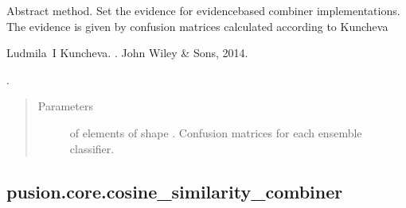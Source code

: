 \documentclass[letterpaper,10pt,english]{sphinxmanual}
\begin{document}
\begin{fulllineitems}
\begin{fulllineitems}
\end{fulllineitems}


\begin{fulllineitems}
\label{\detokenize{pusion.core.combiner:pusion.core.combiner.EvidenceBasedCombiner.set_evidence}}
\sphinxAtStartPar
Abstract method. Set the evidence for evidence\sphinxhyphen{}based combiner implementations.
The evidence is given by confusion matrices calculated according to Kuncheva %
\begin{footnote}[1]\sphinxAtStartFootnote
Ludmila I Kuncheva. . John Wiley \& Sons, 2014.
%
\end{footnote}.

\sphinxAtStartPar

\begin{quote}\begin{description}
\item[{Parameters}] \leavevmode
\sphinxAtStartPar
{} \textendash{}  of  elements of shape . Confusion matrices
for each ensemble classifier.

\end{description}\end{quote}

\end{fulllineitems}


\end{fulllineitems}



\subsection{pusion.core.cosine\_similarity\_combiner}
\label{\detokenize{pusion.core.cosine_similarity_combiner:module-pusion.core.cosine_similarity_combiner}}\label{\detokenize{pusion.core.cosine_similarity_combiner:pusion-core-cosine-similarity-combiner}}\label{\detokenize{pusion.core.cosine_similarity_combiner:cos-cref}}\label{\detokenize{pusion.core.cosine_similarity_combiner::doc}}
\end{document}

